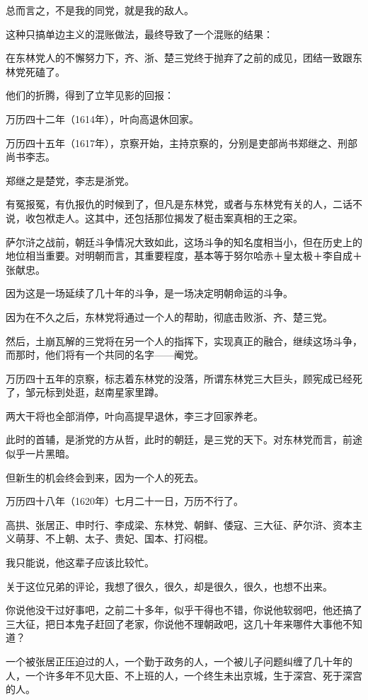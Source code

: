 \begin{multicols}{\theparacolNo}
总而言之，不是我的同党，就是我的敌人。

这种只搞单边主义的混账做法，最终导致了一个混账的结果：

在东林党人的不懈努力下，齐、浙、楚三党终于抛弃了之前的成见，团结一致跟东林党死磕了。

他们的折腾，得到了立竿见影的回报：

万历四十二年（1614年），叶向高退休回家。

万历四十五年（1617年），京察开始，主持京察的，分别是吏部尚书郑继之、刑部尚书李志。

郑继之是楚党，李志是浙党。

有冤报冤，有仇报仇的时候到了，但凡是东林党，或者与东林党有关的人，二话不说，收包袱走人。这其中，还包括那位揭发了梃击案真相的王之寀。

萨尔浒之战前，朝廷斗争情况大致如此，这场斗争的知名度相当小，但在历史上的地位相当重要。对明朝而言，其重要程度，基本等于努尔哈赤＋皇太极＋李自成＋张献忠。

因为这是一场延续了几十年的斗争，是一场决定明朝命运的斗争。

因为在不久之后，东林党将通过一个人的帮助，彻底击败浙、齐、楚三党。

然后，土崩瓦解的三党将在另一个人的指挥下，实现真正的融合，继续这场斗争，而那时，他们将有一个共同的名字——阉党。

万历四十五年的京察，标志着东林党的没落，所谓东林党三大巨头，顾宪成已经死了，邹元标到处逛，赵南星家里蹲。

两大干将也全部消停，叶向高提早退休，李三才回家养老。

此时的首辅，是浙党的方从哲，此时的朝廷，是三党的天下。对东林党而言，前途似乎一片黑暗。

但新生的机会终会到来，因为一个人的死去。

万历四十八年（1620年）七月二十一日，万历不行了。

高拱、张居正、申时行、李成梁、东林党、朝鲜、倭寇、三大征、萨尔浒、资本主义萌芽、不上朝、太子、贵妃、国本、打闷棍。

我只能说，他这辈子应该比较忙。

关于这位兄弟的评论，我想了很久，很久，却是很久，很久，也想不出来。

你说他没干过好事吧，之前二十多年，似乎干得也不错，你说他软弱吧，他还搞了三大征，把日本鬼子赶回了老家，你说他不理朝政吧，这几十年来哪件大事他不知道？

一个被张居正压迫过的人，一个勤于政务的人，一个被儿子问题纠缠了几十年的人，一个许多年不见大臣、不上班的人，一个终生未出京城，生于深宫、死于深宫的人。


\end{multicols}
